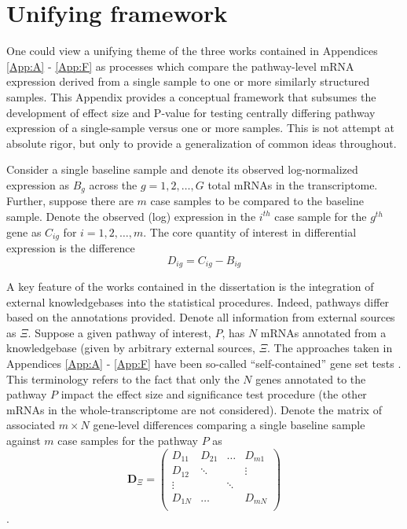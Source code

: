 \chapter{Unifying framework} \label{App:eqns}

\indent \indent One could view a unifying theme of the three works contained in Appendices \ref{App:A} - \ref{App:F} as processes which compare the pathway-level mRNA expression derived from a single sample to one or more similarly structured samples. This Appendix provides a conceptual framework that subsumes the development of effect size and P-value for testing centrally differing pathway expression of a single-sample versus one or more samples. This is not attempt at absolute rigor, but only to provide a generalization of common ideas throughout.

Consider a single baseline sample and denote its observed log-normalized expression as $B_{g}$ across the $g=1,2,\ldots,G$ total mRNAs in the transcriptome. Further, suppose there are $m$ case samples to be compared to the baseline sample. Denote the observed (log) expression in the $i^{th}$ case sample for the $g^{th}$ gene as $C_{ig}$ for $i=1,2,\ldots,m$. The core quantity of interest in differential expression is the difference
\begin{equation*}
\label{eq:diff}
D_{ig}=C_{ig}-B_{ig}
\end{equation*}

A key feature of the works contained in the dissertation is the integration of external knowledgebases into the statistical procedures. Indeed, pathways differ based on the annotations provided. Denote all information from external sources as $\Xi$. Suppose a given pathway of interest, $P$, has $N$ mRNAs annotated from a knowledgebase (given by arbitrary external sources, $\Xi$. The approaches taken in Appendices \ref{App:A} - \ref{App:F} have been so-called ``self-contained'' gene set tests \cite{Goeman2007}. This terminology refers to the fact that only the $N$ genes annotated to the pathway $P$ impact the effect size and significance test procedure (the other mRNAs in the whole-transcriptome are not considered). Denote the matrix of associated $m \times N$ gene-level differences comparing a single baseline sample against $m$ case samples for the pathway $P$ as
\begin{equation*}
  \label{eq:Dmat}
  \mathbf{D}_{\Xi} = \left ( \begin{array}{rcccc}
    D_{11} & D_{21} & \ldots & D_{m1} \\
    D_{12} & \ddots &  & \vdots \\
    \vdots &  & \ddots &  \\
    D_{1N} & \ldots &  & D_{mN} \\
\end{array} \right )
\end{equation*}.

